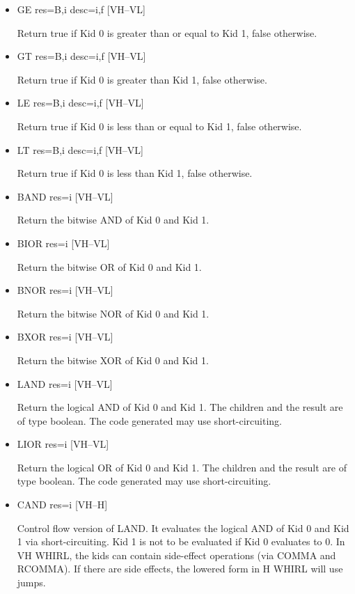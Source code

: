 \documentclass{article}
\begin{document}
\begin{itemize}
%
\item  GE res=B,i desc=i,f \hfill [VH--VL]

Return true if Kid 0 is greater than or equal to Kid 1, false
otherwise.

\item
{}%
GT res=B,i desc=i,f \hfill [VH--VL]

Return true if Kid 0 is greater than Kid 1, false otherwise.

\item
{}%
LE res=B,i desc=i,f \hfill [VH--VL]

Return true if Kid 0 is less than or equal to Kid 1, false otherwise.

\item
{}%
LT res=B,i desc=i,f \hfill [VH--VL]

Return true if Kid 0 is less than Kid 1, false otherwise.

\item
{}%
BAND res=i \hfill [VH--VL]

Return the bitwise AND of Kid 0 and Kid 1.

\item
{}%
BIOR res=i \hfill [VH--VL]

Return the bitwise OR of Kid 0 and Kid 1.

\item
{}%
BNOR res=i \hfill [VH--VL]

Return the bitwise NOR of Kid 0 and Kid 1.

\item
{}%
BXOR res=i \hfill [VH--VL]

Return the bitwise XOR of Kid 0 and Kid 1.

\item
{}%
LAND res=i \hfill [VH--VL]

Return the logical AND of Kid 0 and Kid 1. The children and the
result are of type boolean. The code generated may use short-circuiting.

\item
{}%
LIOR res=i \hfill [VH--VL]

Return the logical OR of Kid 0 and Kid 1. The children and the
result are of type boolean. The code generated may use short-circuiting.

\item
{}%
CAND res=i \hfill [VH--H]

Control flow version of
%
LAND. It evaluates the logical AND of Kid
0 and Kid 1 via short-circuiting. Kid 1 is not to be evaluated if
Kid 0 evaluates to 0. In VH WHIRL, the kids can contain side-effect operations
(via
%
COMMA and
%
RCOMMA). If there are side effects, the lowered form
in H WHIRL will use jumps.


\end{itemize}
\end{document}

